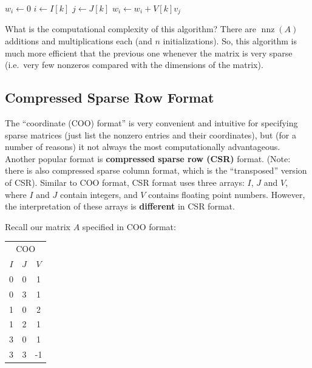 \documentclass[12pt]{article}
\DeclareMathOperator{\nnz}{nnz}
\begin{document}
\begin{algorithm}[H]
   \caption{Matrix-vector product in COO format}
   \begin{algorithmic}[1]
         \State $w_i \gets 0$
      \EndFor
      \For {$k = 0, 1, \ldots, \nnz(A) - 1$}
         \State $i \gets I[k]$
         \State $j \gets J[k]$
         \State $w_i \gets w_i + V[k] v_j$
      \EndFor
   \end{algorithmic}
\end{algorithm}

What is the computational complexity of this algorithm?
There are $\nnz(A)$ additions and multiplications each (and $n$ initializations).
So, this algorithm is much more efficient that the previous one whenever the matrix is very sparse (i.e.\ very few nonzeros compared with the dimensions of the matrix).

\subsection*{Compressed Sparse Row Format}

The ``coordinate (COO) format'' is very convenient and intuitive for specifying sparse matrices (just list the nonzero entries and their coordinates), but (for a number of reasons) it not always the most computationally advantageous.
Another popular format is \textbf{compressed sparse row (CSR)} format.
(Note: there is also compressed sparse column format, which is the ``transposed'' version of CSR).
Similar to COO format, CSR format uses three arrays: $I$, $J$ and $V$, where $I$ and $J$ contain integers, and $V$ contains floating point numbers.
However, the interpretation of these arrays is \textbf{different} in CSR format.

Recall our matrix $A$ specified in COO format:

\begin{center}
   \begin{tabular}{ccc}
      \multicolumn{3}{c}{COO}\\
      $I$ & $J$ & $V$\\
      \hline
      0&0&1\\
      0&3&1\\
      1&0&2\\
      1&2&1\\
      3&0&1\\
      3&3&-1
   \end{tabular}
\end{center}
\end{document}
